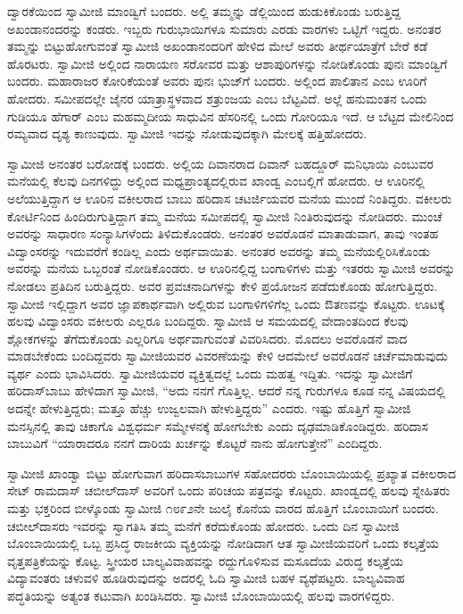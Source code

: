  ದ್ವಾರಕೆಯಿಂದ ಸ್ವಾಮೀಜಿ ಮಾಂಡ್ವಿಗೆ ಬಂದರು. ಅಲ್ಲಿ ತಮ್ಮನ್ನು ಡೆಲ್ಲಿಯಿಂದ ಹುಡುಕಿಕೊಂಡು ಬರುತ್ತಿದ್ದ ಅಖಂಡಾನಂದರನ್ನು ಕಂಡರು. ಇಬ್ಬರು ಗುರುಭಾಯಿಗಳೂ ಸುಮಾರು ಎರಡು ವಾರಗಳು ಒಟ್ಟಿಗೆ ಇದ್ದರು. ಅನಂತರ ತಮ್ಮನ್ನು ಬಿಟ್ಟುಹೋಗುವಂತೆ ಸ್ವಾಮೀಜಿ ಅಖಂಡಾನಂದರಿಗೆ ಹೇಳಿದ ಮೇಲೆ ಅವರು ತೀರ್ಥಯಾತ್ರೆಗೆ ಬೇರೆ ಕಡೆ ಹೊರಟರು. ಸ್ವಾಮೀಜಿ ಅಲ್ಲಿಂದ ನಾರಾಯಣ ಸರೋವರ ಮತ್ತು ಆಶಾಪುರಿಗಳನ್ನು ನೋಡಿಕೊಂಡು ಪುನಃ ಮಾಂಡ್ವಿಗೆ ಬಂದರು. ಮಹಾರಾಜರ ಕೋರಿಕೆಯಂತೆ ಅವರು ಪುನಃ ಭುಜ್‍ಗೆ ಬಂದರು. ಅಲ್ಲಿಂದ ಪಾಲಿತಾನ ಎಂಬ ಊರಿಗೆ ಹೋದರು. ಸಮೀಪದಲ್ಲೇ ಜೈನರ ಯಾತ್ರಾಸ್ಥಳವಾದ ಶತ್ರುಂಜಯ ಎಂಬ ಬೆಟ್ಟವಿದೆ. ಅಲ್ಲೆ ಹನುಮಂತನ ಒಂದು ಗುಡಿಯೂ ಹೆಗಾರ್ ಎಂಬ ಮಹಮ್ಮದೀಯ ಸಾಧುವಿನ ಹೆಸರಿನಲ್ಲಿ ಒಂದು ಗೋರಿಯೂ ಇದೆ. ಆ ಬೆಟ್ಟದ ಮೇಲಿನಿಂದ ರಮ್ಯವಾದ ದೃಶ್ಯ ಕಾಣುವುದು. ಸ್ವಾಮೀಜಿ ಇದನ್ನು ನೋಡುವುದಕ್ಕಾಗಿ ಮೇಲಕ್ಕೆ ಹತ್ತಿಹೋದರು. 

 ಸ್ವಾಮೀಜಿ ಅನಂತರ ಬರೋಡಕ್ಕೆ ಬಂದರು. ಅಲ್ಲಿಯ ದಿವಾನರಾದ ದಿವಾನ್ ಬಹದ್ದೂರ್ ಮನಿಭಾಯಿ ಎಂಬುವರ ಮನೆಯಲ್ಲಿ ಕೆಲವು ದಿನಗಳಿದ್ದು ಅಲ್ಲಿಂದ ಮಧ್ಯಪ್ರಾಂತ್ಯದಲ್ಲಿರುವ ಖಾಂಡ್ವ ಎಂಬಲ್ಲಿಗೆ ಹೋದರು. ಆ ಊರಿನಲ್ಲಿ ಅಲೆಯುತ್ತಿದ್ದಾಗ ಆ ಊರಿನ ವಕೀಲರಾದ ಬಾಬು ಹರಿದಾಸ ಚಟರ್ಜಿಯವರ ಮನೆಯ ಮುಂದೆ ನಿಂತಿದ್ದರು. ವಕೀಲರು ಕೋರ್ಟಿನಿಂದ ಹಿಂದಿರುಗುತ್ತಿದ್ದಾಗ ತಮ್ಮ ಮನೆಯ ಸಮೀಪದಲ್ಲಿ ಸ್ವಾಮೀಜಿ ನಿಂತಿರುವುದನ್ನು ನೋಡಿದರು. ಮುಂಚೆ ಅವರನ್ನು ಸಾಧಾರಣ ಸಂನ್ಯಾಸಿಗಳೆಂದು ತಿಳಿದುಕೊಂಡರು. ಅನಂತರ ಅವರೊಡನೆ ಮಾತಾಡುವಾಗ, ತಾವು ಇಂತಹ ವಿದ್ವಾಂಸರನ್ನು ಇದುವರೆಗೆ ಕಂಡಿಲ್ಲ ಎಂದು ಅರ್ಥವಾಯಿತು. ಅನಂತರ ಅವರನ್ನು ತಮ್ಮ ಮನೆಯಲ್ಲಿರಿಸಿಕೊಂಡು ಅವರನ್ನು ಮನೆಯ ಒಬ್ಬರಂತೆ ನೋಡಿಕೊಂಡರು. ಆ ಊರಿನಲ್ಲಿದ್ದ ಬಂಗಾಳಿಗಳು ಮತ್ತು ಇತರರು ಸ್ವಾಮೀಜಿ ಅವರನ್ನು ನೋಡಲು ಪ್ರತಿದಿನ ಬರುತ್ತಿದ್ದರು. ಅವರ ಪ್ರವಚನಾದಿಗಳನ್ನು ಕೇಳಿ ಪ್ರಯೋಜನ ಪಡೆದುಕೊಂಡು ಹೋಗುತ್ತಿದ್ದರು. ಸ್ವಾಮೀಜಿ ಇಲ್ಲಿದ್ದಾಗ ಅವರ ಜ್ಞಾಪಕಾರ್ಥವಾಗಿ ಅಲ್ಲಿರುವ ಬಂಗಾಳಿಗಳಿಗೆಲ್ಲ ಒಂದು ಔತಣವನ್ನು ಕೊಟ್ಟರು. ಊಟಕ್ಕೆ ಹಲವು ವಿದ್ವಾಂಸರು ವಕೀಲರು ಎಲ್ಲರೂ ಬಂದಿದ್ದರು. ಸ್ವಾಮೀಜಿ ಆ ಸಮಯದಲ್ಲಿ ವೇದಾಂತದಿಂದ ಕೆಲವು ಶ್ಲೋಕಗಳನ್ನು ತೆಗೆದುಕೊಂಡು ಎಲ್ಲರಿಗೂ ಅರ್ಥವಾಗುವಂತೆ ವಿವರಿಸಿದರು. ಮೊದಲು ಅವರೊಡನೆ ವಾದ ಮಾಡಬೇಕೆಂದು ಬಂದಿದ್ದವರು ಸ್ವಾಮೀಜಿಯವರ ವಿವರಣೆಯನ್ನು ಕೇಳಿ ಆದಮೇಲೆ ಅವರೊಡನೆ ಚರ್ಚೆಮಾಡುವುದು ವ್ಯರ್ಥ ಎಂದು ಭಾವಿಸಿದರು. ಸ್ವಾಮೀಜಿಯವರ ವ್ಯಕ್ತಿತ್ವದಲ್ಲೆ ಒಂದು ಮಹತ್ವ ಇದ್ದಿತು. ಇದನ್ನು ಸ್ವಾಮೀಜಿಗೆ ಹರಿದಾಸ್‍ಬಾಬು ಹೇಳಿದಾಗ ಸ್ವಾಮೀಜಿ, “ಅದು ನನಗೆ ಗೊತ್ತಿಲ್ಲ. ಆದರೆ ನನ್ನ ಗುರುಗಳೂ ಕೂಡ ನನ್ನ ವಿಷಯದಲ್ಲಿ ಅದನ್ನೇ ಹೇಳುತ್ತಿದ್ದರು; ಮತ್ತೂ ಹೆಚ್ಚು ಉಜ್ವಲವಾಗಿ ಹೇಳುತ್ತಿದ್ದರು” ಎಂದರು. ಇಷ್ಟು ಹೊತ್ತಿಗೆ ಸ್ವಾಮೀಜಿ ಮನಸ್ಸಿನಲ್ಲಿ ತಾವು ಚಿಕಾಗೊ ವಿಶ್ವಧರ್ಮ ಸಮ್ಮೇಳನಕ್ಕೆ ಹೋಗಬೇಕು ಎಂದು ದೃಢಮಾಡಿಕೊಂಡಿದ್ದರು. ಹರಿದಾಸ ಬಾಬುವಿಗೆ “ಯಾರಾದರೂ ನನಗೆ ದಾರಿಯ ಖರ್ಚನ್ನು ಕೊಟ್ಟರೆ ನಾನು ಹೋಗುತ್ತೇನೆ” ಎಂದಿದ್ದರು. 

ಸ್ವಾಮೀಜಿ ಖಾಂಡ್ವಾ ಬಿಟ್ಟು ಹೋಗುವಾಗ ಹರಿದಾಸಬಾಬುಗಳ ಸಹೋದರರು ಬೊಂಬಾಯಿಯಲ್ಲಿ ಪ್ರಖ್ಯಾತ ವಕೀಲರಾದ ಸೇಟ್ ರಾಮದಾಸ್ ಚಬೀಲ್‍ದಾಸ್ ಅವರಿಗೆ ಒಂದು ಪರಿಚಯ ಪತ್ರವನ್ನು ಕೊಟ್ಟರು. ಖಾಂಡ್ವದಲ್ಲಿ ಹಲವು ಸ್ನೇಹಿತರು ಮತ್ತು ಭಕ್ತರಿಂದ ಬೀಳ್ಕೊಂಡು ಸ್ವಾಮೀಜಿ ೧೮೯೨ನೇ ಜುಲೈ ಕೊನೆಯ ವಾರದ ಹೊತ್ತಿಗೆ ಬೊಂಬಾಯಿಗೆ ಬಂದರು. ಚಬೀಲ್‍ದಾಸರು ಇವರನ್ನು ಸ್ವಾಗತಿಸಿ ತಮ್ಮ ಮನೆಗೆ ಕರೆದುಕೊಂಡು ಹೋದರು. ಒಂದು ದಿನ ಸ್ವಾಮೀಜಿ ಬೊಂಬಾಯಿಯಲ್ಲಿ ಒಬ್ಬ ಪ್ರಸಿದ್ಧ ರಾಜಕೀಯ ವ್ಯಕ್ತಿಯನ್ನು ನೋಡಿದಾಗ ಆತ ಸ್ವಾಮೀಜಿಯವರಿಗೆ ಒಂದು ಕಲ್ಕತ್ತೆಯ ವೃತ್ತಪತ್ರಿಕೆಯನ್ನು ಕೊಟ್ಟ. ಸ್ತ್ರೀಯರ ಬಾಲ್ಯವಿವಾಹವನ್ನು ರದ್ದುಗೊಳಿಸುವ ಮಸೂದೆಯ ವಿರುದ್ಧ ಕಲ್ಕತ್ತೆಯ ವಿದ್ಯಾವಂತರು ಚಳುವಳಿ ಹೂಡಿರುವುದನ್ನು ಅದರಲ್ಲಿ ಓದಿ ಸ್ವಾಮೀಜಿ ಬಹಳ ವ್ಯಥೆಪಟ್ಟರು. ಬಾಲ್ಯವಿವಾಹ ಪದ್ಧತಿಯನ್ನು ಅತ್ಯಂತ ಕಟುವಾಗಿ ಖಂಡಿಸಿದರು. ಸ್ವಾಮೀಜಿ ಬೊಂಬಾಯಿಯಲ್ಲಿ ಹಲವು ವಾರಗಳಿದ್ದರು.

